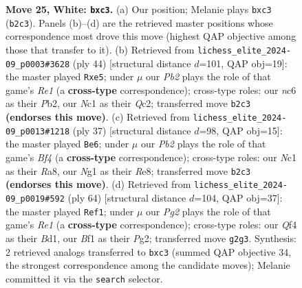 \documentclass[11pt]{article}
\begin{document}
\begin{figure}[p]
\caption{\textbf{Move 25, White: \texttt{bxc3}.} (a) Our position; Melanie plays \texttt{bxc3} (\texttt{b2c3}). Panels (b)--(d) are the retrieved master positions whose correspondence most drove this move (highest QAP objective among those that transfer to it). (b) Retrieved from \texttt{lichess\_elite\_2024-09\_p0003\#3628} (ply 44) [structural distance $d$=101, QAP obj=19]: the master played \texttt{Rxe5}; under $\mu$ our \emph{Pb2} plays the role of that game's \emph{Re1} (a \textbf{cross-type} correspondence); cross-type roles: our \emph{n}c6 as their \emph{P}b2, our \emph{N}c1 as their \emph{Q}c2; transferred move \texttt{b2c3} \textbf{(endorses this move)}. (c) Retrieved from \texttt{lichess\_elite\_2024-09\_p0013\#1218} (ply 37) [structural distance $d$=98, QAP obj=15]: the master played \texttt{Be6}; under $\mu$ our \emph{Pb2} plays the role of that game's \emph{Bf4} (a \textbf{cross-type} correspondence); cross-type roles: our \emph{N}c1 as their \emph{R}a8, our \emph{N}g1 as their \emph{R}e8; transferred move \texttt{b2c3} \textbf{(endorses this move)}. (d) Retrieved from \texttt{lichess\_elite\_2024-09\_p0019\#592} (ply 64) [structural distance $d$=104, QAP obj=37]: the master played \texttt{Ref1}; under $\mu$ our \emph{Pg2} plays the role of that game's \emph{Re1} (a \textbf{cross-type} correspondence); cross-type roles: our \emph{Q}f4 as their \emph{B}d1, our \emph{B}f1 as their \emph{P}g2; transferred move \texttt{g2g3}. Synthesis: 2 retrieved analogs transferred to \texttt{bxc3} (summed QAP objective 34, the strongest correspondence among the candidate moves); Melanie committed it via the \texttt{search} selector.}
\label{fig:thought-m48}
\end{figure}

\clearpage
\end{document}
